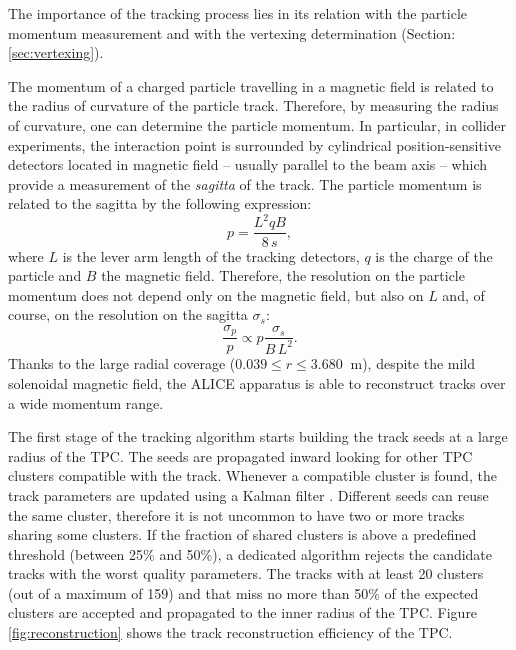 The importance of the tracking process lies in its relation with the particle momentum
measurement and with the vertexing determination (Section: \ref{sec:vertexing}).

The momentum of a charged particle travelling in a magnetic field is related to the radius of curvature
of the particle track. Therefore, by measuring the radius of curvature, one can determine the
particle momentum.
In particular, in collider experiments, the interaction point is surrounded by cylindrical 
position-sensitive detectors located in magnetic field -- usually parallel to the beam axis -- 
which provide a measurement of the \textit{sagitta} of the track.
The particle momentum is related to the sagitta by the following expression:
\begin{equation}
    p = \frac{L^{2} q B}{8\,s},
\end{equation}
where $L$ is the lever arm length of the tracking detectors, $q$ is the charge of the particle and $B$
the magnetic field.
Therefore, the resolution on the particle momentum does not depend only on the magnetic field,
but also on $L$ and, of course, on the resolution on the sagitta $\sigma_{s}$:
\begin{equation}
    \frac{\sigma_{p}}{p} \propto p \frac{\sigma_{s}}{B\,L^{2}}.
\end{equation}
Thanks to the large radial coverage ($0.039 \leq r \leq 3.680\ $ m), despite the mild solenoidal
magnetic field, the ALICE apparatus is able to reconstruct tracks over a wide momentum range.

The first stage of the tracking algorithm starts building the track seeds at a large radius of 
the TPC.
The seeds are propagated inward looking for other TPC clusters compatible with the track.
Whenever a compatible cluster is found, the track parameters are updated using a Kalman filter 
\cite{kalman}. 
Different seeds can reuse the same cluster, therefore it is not uncommon to have two or more
tracks sharing some clusters. 
If the fraction of shared clusters is above a predefined threshold (between 25\% and 50\%), a
dedicated algorithm rejects the candidate tracks with the worst quality parameters.
The tracks with at least 20 clusters (out of a maximum of 159) and that miss no more than 50\% 
of the expected clusters are accepted and propagated to the inner radius of the TPC.
Figure \ref{fig:reconstruction} shows the track reconstruction efficiency of the TPC.

